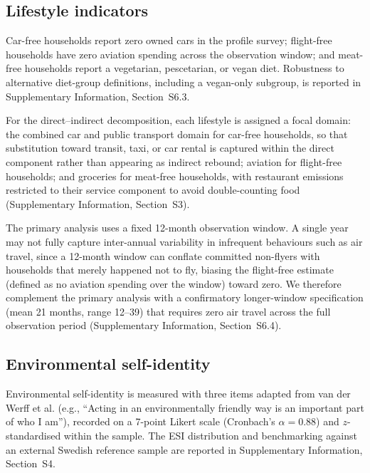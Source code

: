 \documentclass[sn-nature]{sn-jnl}
\begin{document}
\subsection{Lifestyle indicators}
Car-free households report zero owned cars in the profile survey; flight-free households have zero aviation spending across the observation window; and meat-free households report a vegetarian, pescetarian, or vegan diet. Robustness to alternative diet-group definitions, including a vegan-only subgroup, is reported in Supplementary Information, Section~S6.3. 

For the direct--indirect decomposition, each lifestyle is assigned a focal domain: the combined car and public transport domain for car-free households, so that substitution toward transit, taxi, or car rental is captured within the direct component rather than appearing as indirect rebound; aviation for flight-free households; and groceries for meat-free households, with restaurant emissions restricted to their service component to avoid double-counting food (Supplementary Information, Section~S3).

The primary analysis uses a fixed 12-month observation window. A single year may not fully capture inter-annual variability in infrequent behaviours such as air travel, since a 12-month window can conflate committed non-flyers with households that merely happened not to fly, biasing the flight-free estimate (defined as no aviation spending over the window) toward zero. We therefore complement the primary analysis with a confirmatory longer-window specification (mean 21 months, range 12--39) that requires zero air travel across the full observation period (Supplementary Information, Section~S6.4).

\subsection{Environmental self-identity}
Environmental self-identity is measured with three items adapted from van der Werff et al. \citep{VanDerWerff2013} (e.g., ``Acting in an environmentally friendly way is an important part of who I am''), recorded on a 7-point Likert scale (Cronbach's $\alpha = 0.88$) and $z$-standardised within the sample. The ESI distribution and benchmarking against an external Swedish reference sample are reported in Supplementary Information, Section~S4.
\end{document}
